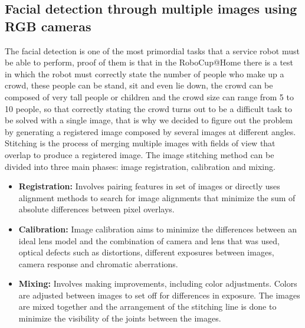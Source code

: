 \documentclass{llncs}
\begin{document}
\subsection{Facial detection through multiple images using RGB cameras}\label{subsec:FacialReco}
The facial detection is one of the most primordial tasks that a service robot must be able to perform, proof of them is that in the RoboCup@Home there is a test in which the robot must correctly state the number of people who make up a crowd, these people can  be stand, sit and even lie down, the crowd can be composed of very tall people or children and the crowd size can range from 5 to 10 people, so that correctly stating the crowd turns out to be a difficult task to be solved with a single image, that is why we decided to figure out the problem by generating a registered image composed by several images at different angles. Stitching is the process of merging multiple images with fields of view that overlap to produce a registered image. %
The image stitching method can be divided into three main phases: image registration, calibration and mixing.

\begin{itemize}
	\item \textbf{Registration:} Involves pairing features in set of images or directly uses alignment methods to search for image alignments that minimize the sum of absolute differences between pixel overlays.
	\item \textbf{Calibration:} Image calibration aims to minimize the differences between an ideal lens model and the combination of camera and lens that was used, optical defects such as distortions, different exposures between images, camera response and chromatic aberrations.
	\item \textbf{Mixing:} Involves making improvements, including color adjustments. Colors are adjusted between images to set off for differences in exposure. The images are mixed together and the arrangement of the stitching line is done to minimize the visibility of the joints between the images.
\end{itemize}
\end{document}

